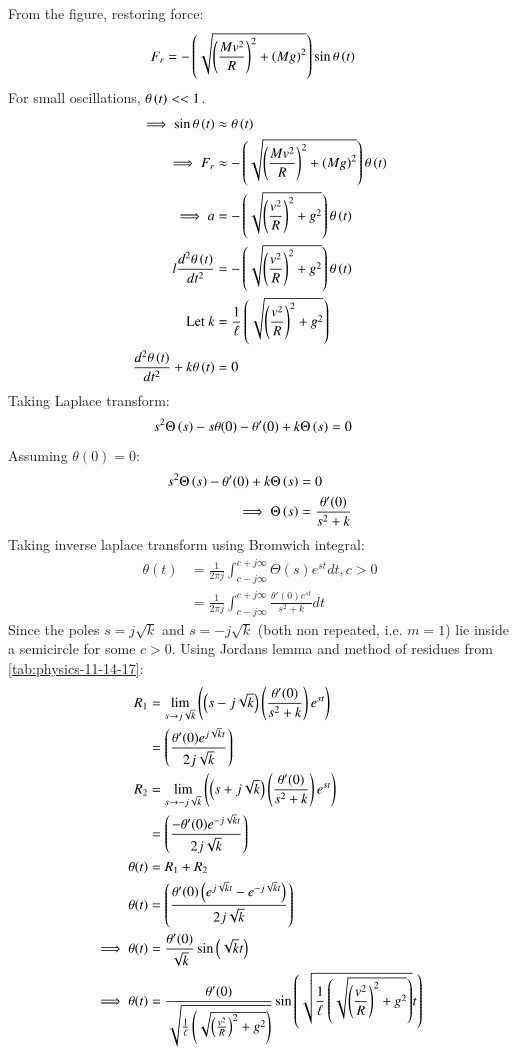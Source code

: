 \documentclass[journal,12pt,twocolumn]{IEEEtran}
\theoremstyle{remark}
\begin{document}
From the figure, restoring force:
\begin{align}
F_r &= -\left(\sqrt{\left(\frac{Mv^2}{R}\right)^2+\left(Mg\right)^2}\right)\sin{\theta\ensuremath{\left(t\right)}}
\end{align}
For small oscillations, $\theta\left(t\right) << 1$.
\begin{align}
\implies \sin{\theta\ensuremath{\left(t\right)}} &\approx \theta\left(t\right) \\
\implies F_r &\approx -\left(\sqrt{\left(\frac{Mv^2}{R}\right)^2+\left(Mg\right)^2}\right)\theta\left(t\right) \\
\implies a &= -\left(\sqrt{\left(\frac{v^2}{R}\right)^2+g^2}\right)\theta\left(t\right) \\
l\frac{d^2\theta\left(t\right)}{dt^2} &= -\left(\sqrt{\left(\frac{v^2}{R}\right)^2+g^2}\right)\theta\left(t\right) \\
\text{Let } k &= \frac{1}{\ell}\left(\sqrt{\left(\frac{v^2}{R}\right)^2+g^2}\right) \\
\frac{d^2\theta\left(t\right)}{dt^2} + k\theta\left(t\right) &= 0 \\
\end{align}
Taking Laplace transform:
\begin{align}
s^2\Theta\left(s\right) - s\theta(0) - \theta'(0) + k\Theta\left(s\right) &= 0
\end{align}
Assuming $\theta(0) = 0$:
\begin{align}
s^2\Theta\left(s\right) - \theta'(0) + k\Theta\left(s\right) &= 0 \\
\implies \Theta\left(s\right) &= \frac{\theta'(0)}{s^2 + k}
\end{align}
Taking inverse laplace transform using Bromwich integral:
\begin{align}
\theta(t) &= \frac{1}{2\pi j}\int_{c-j\infty}^{c+j\infty}\Theta(s)e^{st}dt, c > 0 \\
&= \frac{1}{2\pi j}\int_{c-j\infty}^{c+j\infty}\frac{\theta'(0)e^{st}}{s^2 + k}dt
\end{align}
Since the poles $s=j\sqrt{k}$ and $s=-j\sqrt{k}$ (both non repeated, i.e. $m=1$) lie inside a semicircle for some $c>0$. Using Jordans lemma and method of residues from \ref{tab:physics-11-14-17}:
\begin{align}
R_1&=\lim\limits_{s\to j\sqrt{k}}\left({\left(s-j\sqrt{k}\right)}\left(\frac{\theta'(0)}{s^2+k}\right) e^{st}\right)\\
&={\left(\frac{\theta'(0)e^{j\sqrt{k}t}}{2j\sqrt{k}}\right)}\\
R_2&=\lim\limits_{s\to -j\sqrt{k}}\left({\left(s+j\sqrt{k}\right)}\left(\frac{\theta'(0)}{s^2+k}\right) e^{st}\right)\\
&={\left(\frac{-\theta'(0)e^{-j\sqrt{k}t}}{2j\sqrt{k}}\right)}\\
\theta(t) &= R_1 + R_2\\
\theta(t) &= {\left(\frac{\theta'(0)\left(e^{j\sqrt{k}t}-e^{-j\sqrt{k}t}\right)}{2j\sqrt{k}}\right)}\\
\implies
\theta(t) &=\frac{\theta'(0)}{\sqrt{k}}\sin{\ensuremath{\left(\sqrt{k}t\right)}} \\
\implies \theta(t) &= \frac{\theta'(0)}{\sqrt{\frac{1}{\ell}\left(\sqrt{\left(\frac{v^2}{R}\right)^2+g^2}\right)}}\sin{\ensuremath{\left(\sqrt{\frac{1}{\ell}\left(\sqrt{\left(\frac{v^2}{R}\right)^2+g^2}\right)}t\right)}}
\end{align}
\end{document}
